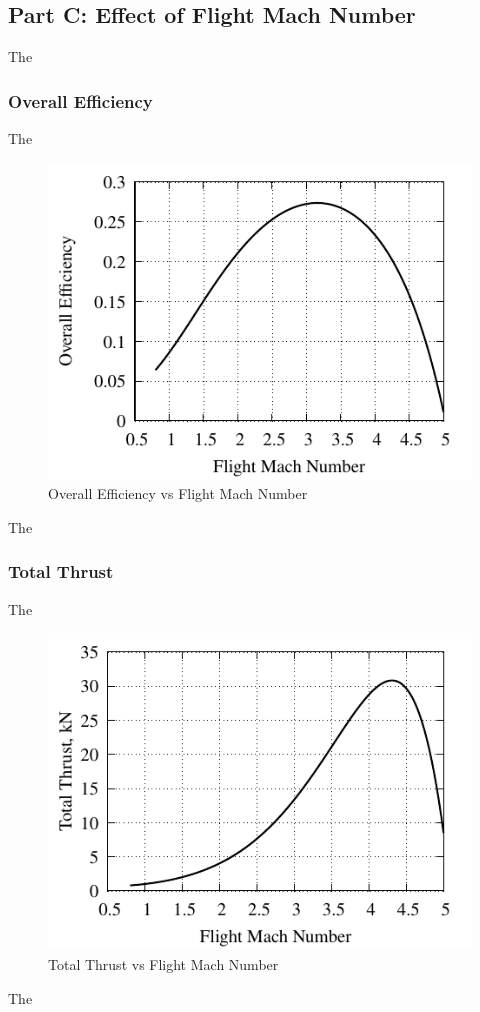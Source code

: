 \documentclass[conf]{new-aiaa} %
\begin{document}
\subsection{Part C: Effect of Flight Mach Number}
The

\subsubsection{Overall Efficiency}
The

\begin{figure}[hbt!]
\centering
\includegraphics[]{media/performance_parameter_files/part_c_eta_o.pdf}
\caption{\label{fig:partcetao} Overall Efficiency vs Flight Mach Number}
\end{figure}
The

\subsubsection{Total Thrust}
The

\begin{figure}[hbt!]
\centering
\includegraphics[]{media/performance_parameter_files/part_c_T.pdf}
\caption{\label{fig:partct} Total Thrust vs Flight Mach Number}
\end{figure}
The
\end{document}
